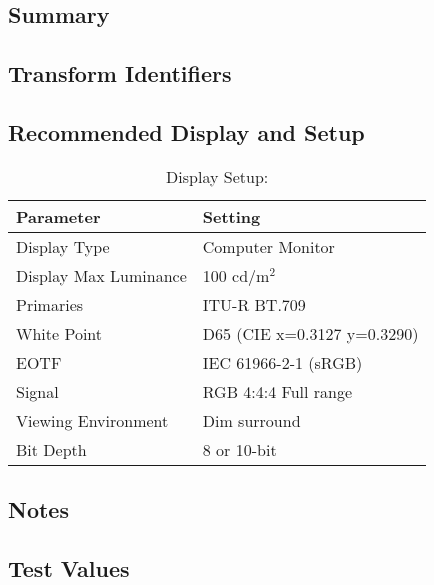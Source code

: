 \section[sRGB]{\shortName{}}
\label{sec:odt-details-\id}

\subsection{Summary}
\label{subsec:summary-\id}

\lipsum[1-2] %

\subsection{Transform Identifiers} 
\label{subsec:odt-ident-\id}

\subsection{Recommended Display and Setup}
\label{subsec:setup-\id}

\begin{table}[ht!]
    \centering
        \begin{tabular}{|p{1.5in}|p{3in}|}
            \hline
            \textbf{Parameter} 		& 	\textbf{Setting} 				 		\\ \hline
            Display Type 			&	Computer Monitor						\\ \hline
            Display Max Luminance 	& 	100 cd/m$^2$							\\ \hline
            Primaries	 			& 	ITU-R BT.709							\\ \hline
            White Point	 			& 	D65 (CIE x=0.3127 y=0.3290)				\\ \hline
            EOTF					& 	IEC 61966-2-1 (sRGB)		 			\\ \hline
            Signal 					&	RGB 4:4:4 Full range					\\ \hline
            Viewing Environment 	& 	Dim surround							\\ \hline
            Bit Depth 				& 	8 or 10-bit	 							\\ \hline 
    \end{tabular}
    \caption{Display Setup: \shortName{}} 
    \label{tab:setup-\id}
\end{table}

\subsection{Notes}
\label{subsec:notes-\id}

\lipsum[1-2] %


\subsection{Test Values}
\label{subsec:testValues-\id}

\testValuesSubSec{}

